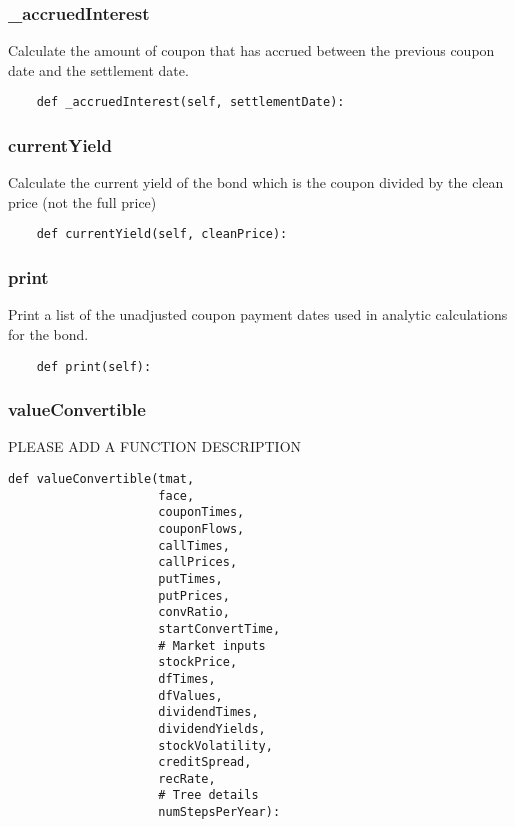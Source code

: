 \documentclass[twoside,11pt]{book}
\begin{document}
\subsubsection*{{\bf \_accruedInterest}}
Calculate the amount of coupon that has accrued between the previous coupon date and the settlement date.  

\begin{lstlisting}
    def _accruedInterest(self, settlementDate):
\end{lstlisting}

\subsubsection*{{\bf currentYield}}
Calculate the current yield of the bond which is the coupon divided by the clean price (not the full price) 

\begin{lstlisting}
    def currentYield(self, cleanPrice):
\end{lstlisting}

\subsubsection*{{\bf print}}
Print a list of the unadjusted coupon payment dates used in analytic calculations for the bond.  

\begin{lstlisting}
    def print(self):
\end{lstlisting}

\subsubsection*{{\bf valueConvertible}}
PLEASE ADD A FUNCTION DESCRIPTION

\begin{lstlisting}
def valueConvertible(tmat,
                     face,
                     couponTimes,
                     couponFlows,
                     callTimes,
                     callPrices,
                     putTimes,
                     putPrices,
                     convRatio,
                     startConvertTime,
                     # Market inputs
                     stockPrice,
                     dfTimes,
                     dfValues,
                     dividendTimes,
                     dividendYields,
                     stockVolatility,
                     creditSpread,
                     recRate,
                     # Tree details
                     numStepsPerYear):
\end{lstlisting}
\end{document}
